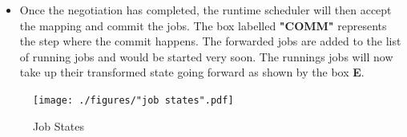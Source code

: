 \begin{itemize}
\item Once the negotiation has completed, the runtime scheduler will then accept the mapping and commit the jobs. The box labelled \textbf{"COMM"} represents the step where the commit happens. The forwarded jobs are added to the list of running jobs and would be started very soon. The runnings jobs will now take up their transformed state going forward as shown by the box \textbf{E}.
\end{itemize}
\begin{figure}[!b]
\centering
\texttt{[image: ./figures/"job states".pdf]}
\caption{Job States}
\label{fig:53}
\end{figure}
